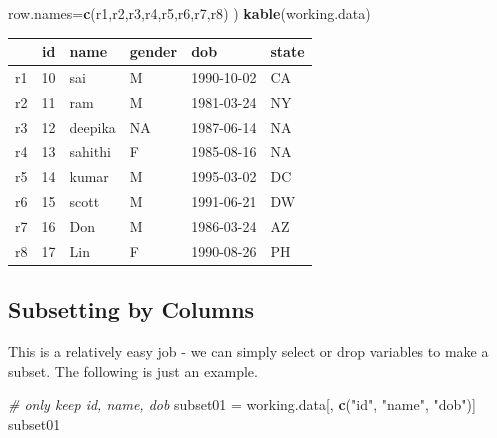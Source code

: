 \documentclass[
]{book}
\newenvironment{Shaded}{\begin{snugshade}}{\end{snugshade}}
\newcommand{\AttributeTok}[1]{\textcolor[rgb]{0.13,0.29,0.53}{#1}}
\newcommand{\CommentTok}[1]{\textcolor[rgb]{0.56,0.35,0.01}{\textit{#1}}}
\newcommand{\FunctionTok}[1]{\textcolor[rgb]{0.13,0.29,0.53}{\textbf{#1}}}
\newcommand{\NormalTok}[1]{#1}
\newcommand{\OtherTok}[1]{\textcolor[rgb]{0.56,0.35,0.01}{#1}}
\newcommand{\StringTok}[1]{\textcolor[rgb]{0.31,0.60,0.02}{#1}}
\begin{document}
\begin{Shaded}
\begin{Highlighting}[]
  \AttributeTok{row.names=}\FunctionTok{c}\NormalTok{(}\StringTok{\textquotesingle{}r1\textquotesingle{}}\NormalTok{,}\StringTok{\textquotesingle{}r2\textquotesingle{}}\NormalTok{,}\StringTok{\textquotesingle{}r3\textquotesingle{}}\NormalTok{,}\StringTok{\textquotesingle{}r4\textquotesingle{}}\NormalTok{,}\StringTok{\textquotesingle{}r5\textquotesingle{}}\NormalTok{,}\StringTok{\textquotesingle{}r6\textquotesingle{}}\NormalTok{,}\StringTok{\textquotesingle{}r7\textquotesingle{}}\NormalTok{,}\StringTok{\textquotesingle{}r8\textquotesingle{}}\NormalTok{)}
\NormalTok{)}
\FunctionTok{kable}\NormalTok{(working.data)}
\end{Highlighting}
\end{Shaded}

\begin{tabular}{l|r|l|l|l|l}
\hline
  & id & name & gender & dob & state\\
\hline
r1 & 10 & sai & M & 1990-10-02 & CA\\
\hline
r2 & 11 & ram & M & 1981-03-24 & NY\\
\hline
r3 & 12 & deepika & NA & 1987-06-14 & NA\\
\hline
r4 & 13 & sahithi & F & 1985-08-16 & NA\\
\hline
r5 & 14 & kumar & M & 1995-03-02 & DC\\
\hline
r6 & 15 & scott & M & 1991-06-21 & DW\\
\hline
r7 & 16 & Don & M & 1986-03-24 & AZ\\
\hline
r8 & 17 & Lin & F & 1990-08-26 & PH\\
\hline
\end{tabular}

\hypertarget{subsetting-by-columns}{%
\subsection{Subsetting by Columns}\label{subsetting-by-columns}}

This is a relatively easy job - we can simply select or drop variables to make a subset. The following is just an example.

\begin{Shaded}
\begin{Highlighting}[]
\CommentTok{\# only keep id, name, dob}
\NormalTok{subset01 }\OtherTok{=}\NormalTok{ working.data[, }\FunctionTok{c}\NormalTok{(}\StringTok{"id"}\NormalTok{, }\StringTok{"name"}\NormalTok{, }\StringTok{"dob"}\NormalTok{)]}
\NormalTok{subset01}
\end{Highlighting}
\end{Shaded}
\end{document}
